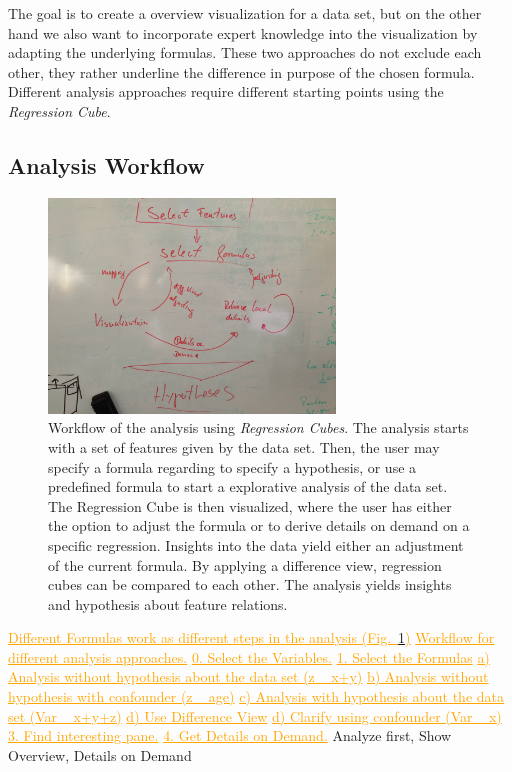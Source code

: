 \documentclass[journal]{style/vgtc} 			          %
\newcommand{\com}[1]{\textcolor{orange}{\uline{#1}}}
\begin{document}
The goal is to create a overview visualization for a data set, but on the other hand we also want to incorporate expert knowledge into the visualization by adapting the underlying formulas.
These two approaches do not exclude each other, they rather underline the difference in purpose of the chosen formula.
Different analysis approaches require different starting points using the \emph{Regression Cube}.

\subsection{Analysis Workflow}
\begin{figure}[htb]
 \centering
 \includegraphics[width=3.0in]{figures/workflow_sketch}
 \caption{
 Workflow of the analysis using \emph{Regression Cubes}.
 The analysis starts with a set of features given by the data set.
 Then, the user may specify a formula regarding to specify a hypothesis, or use a predefined formula to start a explorative analysis of the data set.
 The Regression Cube is then visualized, where the user has either the option to adjust the formula or to derive details on demand on a specific regression.
 Insights into the data yield either an adjustment of the current formula.
 By applying a difference view, regression cubes can be compared to each other.
 The analysis yields insights and hypothesis about feature relations.
 }
  \label{fig:Workflow}
\end{figure}

\com{Different Formulas work as different steps in the analysis (Fig.~\ref{fig:Workflow})}
 \com{Workflow for different analysis approaches.}
 \com{0. Select the Variables.}
 \com{1. Select the Formulas}
 \com{a) Analysis without hypothesis about the data set (z ~ x+y)}
 \com{b) Analysis without hypothesis with confounder (z ~ age)}
 \com{c) Analysis with hypothesis about the data set (Var ~ x+y+z)}
 \com{d) Use Difference View}
 \com{d) Clarify using confounder (Var ~ x)}
 \com{3. Find interesting pane.}
 \com{4. Get Details on Demand.}
Analyze first, Show Overview, Details on Demand
\end{document}
